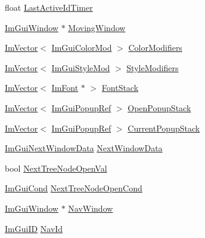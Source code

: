 \begin{DoxyCompactItemize}
\item 
float \mbox{\hyperlink{struct_im_gui_context_a7296c8f2a4794c561cfb4ad0af563928}{Last\+Active\+Id\+Timer}}
\item 
\mbox{\hyperlink{struct_im_gui_window}{Im\+Gui\+Window}} $\ast$ \mbox{\hyperlink{struct_im_gui_context_a28078cc22f615213fd8544016cd6ae20}{Moving\+Window}}
\item 
\mbox{\hyperlink{class_im_vector}{Im\+Vector}}$<$ \mbox{\hyperlink{struct_im_gui_color_mod}{Im\+Gui\+Color\+Mod}} $>$ \mbox{\hyperlink{struct_im_gui_context_a10f0f969b6c9886e5f2c080ed6f1370d}{Color\+Modifiers}}
\item 
\mbox{\hyperlink{class_im_vector}{Im\+Vector}}$<$ \mbox{\hyperlink{struct_im_gui_style_mod}{Im\+Gui\+Style\+Mod}} $>$ \mbox{\hyperlink{struct_im_gui_context_ac0feba14c36c7dff87211c3650815be7}{Style\+Modifiers}}
\item 
\mbox{\hyperlink{class_im_vector}{Im\+Vector}}$<$ \mbox{\hyperlink{struct_im_font}{Im\+Font}} $\ast$ $>$ \mbox{\hyperlink{struct_im_gui_context_a8a6a9f23604fe0d0b51c78e45e4432b0}{Font\+Stack}}
\item 
\mbox{\hyperlink{class_im_vector}{Im\+Vector}}$<$ \mbox{\hyperlink{struct_im_gui_popup_ref}{Im\+Gui\+Popup\+Ref}} $>$ \mbox{\hyperlink{struct_im_gui_context_af6c0e07cff9641d31bdf22b7e7df2842}{Open\+Popup\+Stack}}
\item 
\mbox{\hyperlink{class_im_vector}{Im\+Vector}}$<$ \mbox{\hyperlink{struct_im_gui_popup_ref}{Im\+Gui\+Popup\+Ref}} $>$ \mbox{\hyperlink{struct_im_gui_context_a7b2472ca52bcccb98e0db1a8b1b78853}{Current\+Popup\+Stack}}
\item 
\mbox{\hyperlink{struct_im_gui_next_window_data}{Im\+Gui\+Next\+Window\+Data}} \mbox{\hyperlink{struct_im_gui_context_a1220ef65a7464ef2dc4a6020cd1b9c47}{Next\+Window\+Data}}
\item 
bool \mbox{\hyperlink{struct_im_gui_context_aed0758191a1eb49ffed88a7682829c1f}{Next\+Tree\+Node\+Open\+Val}}
\item 
\mbox{\hyperlink{imgui_8h_aef890d6ac872e12c5804d0b3e4f7f103}{Im\+Gui\+Cond}} \mbox{\hyperlink{struct_im_gui_context_aeaca84fcb1dd6df0f9fb18df715e8460}{Next\+Tree\+Node\+Open\+Cond}}
\item 
\mbox{\hyperlink{struct_im_gui_window}{Im\+Gui\+Window}} $\ast$ \mbox{\hyperlink{struct_im_gui_context_ae06077e45c894488b28baaf2d7ff8e41}{Nav\+Window}}
\item 
\mbox{\hyperlink{imgui_8h_a1785c9b6f4e16406764a85f32582236f}{Im\+Gui\+ID}} \mbox{\hyperlink{struct_im_gui_context_a0416d655ac426f9923dab220d95a4b6b}{Nav\+Id}}

\end{DoxyCompactItemize}

